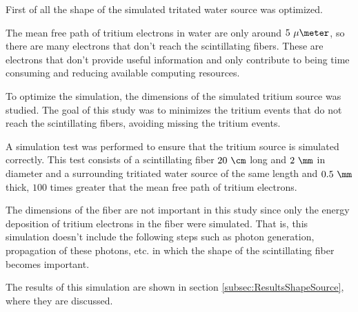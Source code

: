 First of all the shape of the simulated tritated water source was optimized. 

The mean free path of tritium electrons in water are only around $5~\mu\meter$, so there are many electrons that don't reach the scintillating fibers. These are electrons that don't provide useful information and only contribute to being time consuming and reducing available computing resources.

To optimize the simulation, the dimensions of the simulated tritium source was studied. The goal of this study was to minimizes the tritium events that do not reach the scintillating fibers, avoiding missing the tritium events.

A simulation test was performed to ensure that the tritium source is simulated correctly. This test consists of a scintillating fiber $20~\cm$ long and $2~\mm$ in diameter and a surrounding tritiated water source of the same length and $0.5~\mm$ thick, $100$ times greater that the mean free path of tritium electrons. %

The dimensions of the fiber are not important in this study since only the energy deposition of tritium electrons in the fiber were simulated. That is, this simulation doesn't include the following steps such as photon generation, propagation of these photons, etc. in which the shape of the scintillating fiber becomes important.


The results of this simulation are shown in section \ref{subsec:ResultsShapeSource}, where they are discussed.